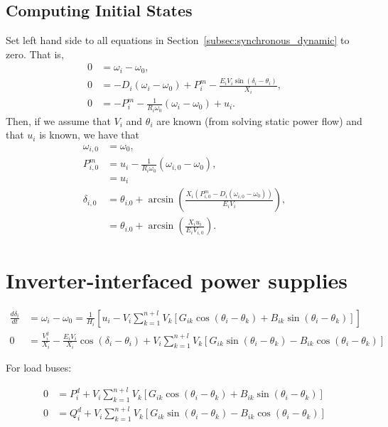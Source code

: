 \documentclass[english,11pt]{article}
\newcommand{\1}{\mathbf{1}}
\begin{document}
\subsection{Computing Initial States}	
Set left hand side to all equations in Section~\ref{subsec:synchronous_dynamic} to zero. That is,
	\begin{align}
		0 &= \omega_i - \omega_0,\\
		0 &= -D_i (\omega_i - \omega_0) + P_i^m - \frac{E_i V_i \sin(\delta_i - \theta_i)}{X_i},\\
		0 &= -P_i^m - \frac{1}{R_i \omega_0}(\omega_i - \omega_0) + u_i.
	\end{align}
	Then, if we assume that $V_i$ and $\theta_i$ are known (from solving static power flow) and that $u_i$ is known, we have that
	\begin{align}
		\omega_{i,0} 	&= \omega_0,\\
		P_{i,0}^m 		&= u_i - \frac{1}{R_i \omega_0}(\omega_{i,0} - \omega_0),\\
						&= u_i\\
		\delta_{i,0}	&= \theta_{i.0} + \arcsin{\left (\frac{X_i(P_{i,0}^m - D_i (\omega_{i,0} - \omega_0))}{E_i V_i} \right)},\\
						&= \theta_{i.0} + \arcsin{\left (\frac{X_i u_i}{E_i V_{i,0}}\right)}.
	\end{align}

\section{Inverter-interfaced power supplies}

	\begin{align}
		\frac{d \delta_i}{dt} &= \omega_i - \omega_0 = \frac{1}{H_i}\left [ u_i - V_i\sum_{k=1}^{n+l} V_k \left [G_{ik}\cos(\theta_i-\theta_k) + B_{ik}\sin(\theta_i-\theta_k) \right ] \right]\\
		0 &= \frac{V_i^2}{X_i} - \frac{E_i V_i}{X_i}\cos(\delta_i - \theta_i) + V_i \sum_{k=1}^{n+l} V_k \left [ G_{ik}\sin(\theta_i - \theta_k) - B_{ik}\cos(\theta_i - \theta_k)\right]
	\end{align}


For load buses:

	\begin{align}
		0 &= P_i^d + V_i\sum_{k=1}^{n+l} V_k \left [G_{ik}\cos(\theta_i-\theta_k) + B_{ik}\sin(\theta_i-\theta_k) \right ]\\
		0 &= Q_i^d + V_i \sum_{k=1}^{n+l} V_k \left [ G_{ik}\sin(\theta_i - \theta_k) - B_{ik}\cos(\theta_i - \theta_k)\right]
	\end{align}
\end{document}
